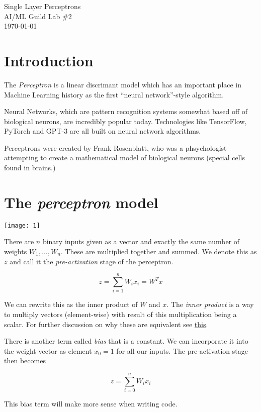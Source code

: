 \documentclass[letterpaper,12pt]{article}
\begin{document}
\begin{flushleft}
Single Layer Perceptrons\\
AI/ML Guild Lab \#2\\
\today \\
\end{flushleft}

\section{Introduction}

The \emph{Perceptron} is a linear discrimant model which has an important place
in Machine Learning history as the first ``neural network''-style algorithm.

Neural Networks, which are pattern recognition systems somewhat based off of
biological neurons, are incredibly popular today. Technologies like TensorFlow,
PyTorch and GPT-3 are all built on neural network algorithms.

Perceptrons were created by Frank Rosenblatt, who was a phsychologist
attempting to create a mathematical model of biological neurons (special cells
found in brains.)

\section{The \emph{perceptron} model}

\texttt{[image: 1]}

There are $n$ binary inputs given as a vector and exactly the same number of
weights $W_1, \ldots, W_n$.  These are multiplied together and summed. We denote
this as $z$ and call it the \emph{pre-activation} stage of the perceptron.

\[
    z = \sum_{i=1}^{n} W_i x_i = W^{T}x
\]

We can rewrite this as the inner product of $W$ and $x$. The \emph{inner
product} is a way to multiply vectors (element-wise) with result of this
multiplication being a scalar. For further discussion on why these are
equivalent see
\href{http://www.sharetechnote.com/html/Handbook_EngMath_Matrix_InnerProduct.html}{this}.

There is another term called \emph{bias} that is a constant. We can incorporate it
into the weight vector as element $x_0 = 1$ for all our inputs. The
pre-activation stage then becomes

\[
    z = \sum_{i=0}^{n} W_i x_i
\]

This bias term will make more sense when writing code.
\end{document}
